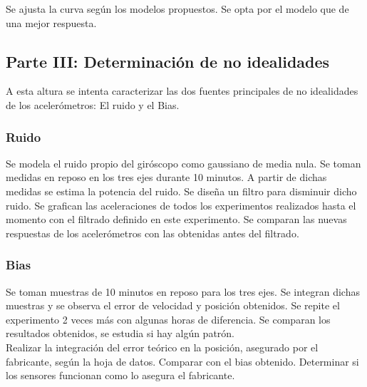 \documentclass[spanish,12pt,a4paper,titlepage]{report}
\begin{document}
Se ajusta la curva según los modelos propuestos. Se opta por el modelo que de una mejor respuesta.

\subsection{Parte III: Determinación de no idealidades}
A esta altura se intenta caracterizar las dos fuentes principales de no idealidades de los acelerómetros: El ruido y el Bias.

\subsubsection*{Ruido}
Se modela el ruido propio del giróscopo como gaussiano de media nula. Se toman medidas en reposo en los tres ejes durante 10 minutos. A partir de dichas medidas se estima la potencia del ruido. Se diseña un filtro para disminuir dicho ruido. Se grafican las aceleraciones de todos los experimentos realizados hasta el momento con el filtrado definido en este experimento. Se comparan las nuevas respuestas de los acelerómetros con las obtenidas antes del filtrado. 

\subsubsection*{Bias}
Se toman muestras de 10 minutos en reposo para los tres ejes. Se integran dichas muestras y se observa el error de velocidad y posición obtenidos. Se repite el experimento 2 veces más con algunas horas de diferencia. Se comparan los resultados obtenidos, se estudia si hay algún patrón.\\

Realizar la integración del error teórico en la posición, asegurado por el fabricante, según la hoja de datos. Comparar con el bias obtenido. Determinar si los sensores funcionan como lo asegura el fabricante.
\end{document}

